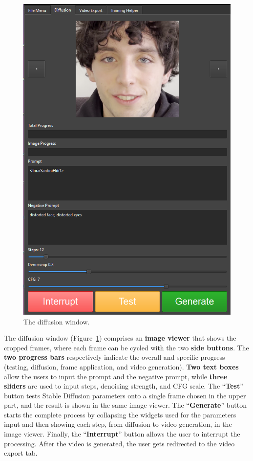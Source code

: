 \documentclass[preprint]{elsarticle}
\begin{document}
\begin{figure}[H]
	\centering
	\includegraphics[scale=0.45, keepaspectratio]{img/project_img/generation-window.png}
	\caption{The diffusion window.}
	\label{fig:diffusion-menu}
\end{figure}



The diffusion window (Figure~\ref{fig:diffusion-menu}) comprises an \textbf{image viewer} that 
shows the cropped frames, where each frame can be cycled with the two \textbf{side buttons}. 
The \textbf{two progress bars} respectively indicate the overall and  specific progress (testing, diffusion, frame application, and video generation). \textbf{Two text boxes} allow the users to input the prompt and the negative prompt, while \textbf{three sliders} are used to input steps, denoising strength, and CFG scale. The ``\textbf{Test}'' button tests Stable Diffusion parameters onto a single frame chosen  in the upper part, and the result is shown in the same image viewer. 
The ``\textbf{Generate}'' button starts the complete process by collapsing the widgets used  for the parameters input and then showing each step, from diffusion to video generation, 
in the image viewer. 
Finally, the ``\textbf{Interrupt}'' button allows the user to interrupt the processing.  After the video is generated, the user gets redirected to the video export tab.
\end{document}
